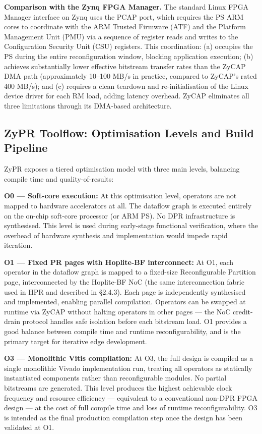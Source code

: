 \textbf{Comparison with the Zynq FPGA Manager.} The standard Linux FPGA Manager interface on Zynq uses the PCAP port, which requires the PS ARM cores to coordinate with the ARM Trusted Firmware (ATF) and the Platform Management Unit (PMU) via a sequence of register reads and writes to the Configuration Security Unit (CSU) registers. This coordination: (a) occupies the PS during the entire reconfiguration window, blocking application execution; (b) achieves substantially lower effective bitstream transfer rates than the ZyCAP DMA path (approximately 10–100 MB/s in practice, compared to ZyCAP's rated 400 MB/s); and (c) requires a clean teardown and re-initialisation of the Linux device driver for each RM load, adding latency overhead. ZyCAP eliminates all three limitations through its DMA-based architecture.

\subsection{ZyPR Toolflow: Optimisation Levels and Build Pipeline}

ZyPR exposes a tiered optimisation model with three main levels, balancing compile time and quality-of-results:

\textbf{O0 — Soft-core execution:} At this optimisation level, operators are not mapped to hardware accelerators at all. The dataflow graph is executed entirely on the on-chip soft-core processor (or ARM PS). No DPR infrastructure is synthesised. This level is used during early-stage functional verification, where the overhead of hardware synthesis and implementation would impede rapid iteration.

\textbf{O1 — Fixed PR pages with Hoplite-BF interconnect:} At O1, each operator in the dataflow graph is mapped to a fixed-size Reconfigurable Partition page, interconnected by the Hoplite-BF NoC (the same interconnection fabric used in HPR and described in §2.4.3). Each page is independently synthesised and implemented, enabling parallel compilation. Operators can be swapped at runtime via ZyCAP without halting operators in other pages — the NoC credit-drain protocol handles safe isolation before each bitstream load. O1 provides a good balance between compile time and runtime reconfigurability, and is the primary target for iterative edge development.

\textbf{O3 — Monolithic Vitis compilation:} At O3, the full design is compiled as a single monolithic Vivado implementation run, treating all operators as statically instantiated components rather than reconfigurable modules. No partial bitstreams are generated. This level produces the highest achievable clock frequency and resource efficiency — equivalent to a conventional non-DPR FPGA design — at the cost of full compile time and loss of runtime reconfigurability. O3 is intended as the final production compilation step once the design has been validated at O1.

